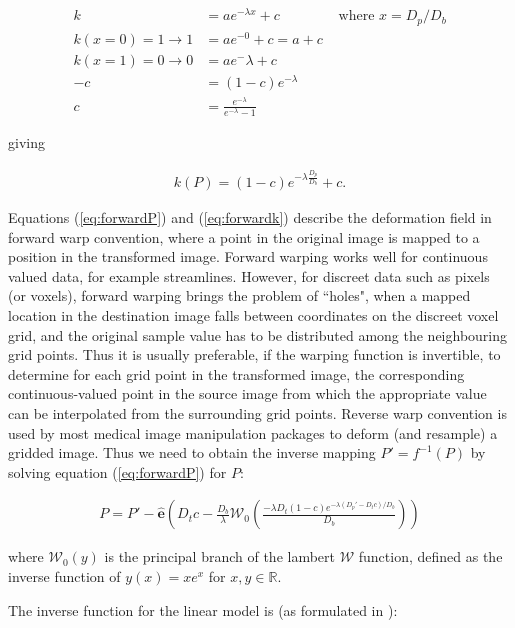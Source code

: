 \begin{align*}
  k &= a e^{-\lambda x} + c &\text{ where } x = D_p / D_b \\
  k(x=0)=1 \longrightarrow 1 &= a e^{-0} + c = a + c \\
  k(x=1)=0 \longrightarrow 0 &= a e{^-\lambda} + c \\
  -c &= (1-c) e^{-\lambda} \\
  c &= \frac{e^{-\lambda}}{e^{-\lambda} - 1}
\end{align*}

giving

\begin{align}\label{eq:forwardk}
  k(P) = (1-c)e^{-\lambda \frac{D_p}{D_b}} +c.
\end{align}

Equations (\ref{eq:forwardP}) and (\ref{eq:forwardk}) describe the deformation field in forward warp convention, where a point in the original image is mapped to a position in the transformed image.
Forward warping works well for continuous valued data, for example streamlines.
However, for discreet data such as pixels (or voxels), forward warping brings the problem of ``holes", when a mapped location in the destination image falls between coordinates on the discreet voxel grid, and the original sample value has to be distributed among the neighbouring grid points.
Thus it is usually preferable, if the warping function is invertible, to determine for each grid point in the transformed image, the corresponding continuous-valued point in the source image from which the appropriate value can be interpolated from the surrounding grid points. 
Reverse warp convention is used by most  medical image manipulation packages to deform (and resample) a gridded image.
Thus we need to obtain the inverse mapping $P' = f^{-1}(P)$ by solving equation (\ref{eq:forwardP}) for $P$:

\begin{align}
  P = P' - \mathbf{\hat{e}}(D_t c - \frac{D_b}{\lambda}\mathcal{W}_0(\frac{-\lambda D_t (1-c) e^{-\lambda(D_p'-D_tc)/D_b}}{D_b}))
\end{align}

where $\mathcal{W}_0(y)$ is the principal branch of the lambert $\mathcal{W}$ function, defined as the inverse function of $ y(x) = xe^x $ for $x,y \in \mathbb{R}$. 

The inverse function for the linear model is (as formulated in \textcite{Nowinski2005}):

